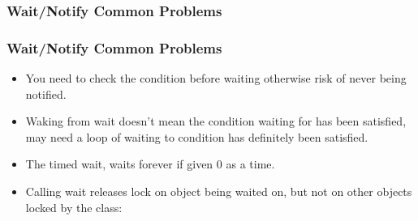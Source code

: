 \documentclass{beamer}
\begin{document}
\subsubsection{Wait/Notify Common Problems}
\begin{frame}
\frametitle{Wait/Notify Common Problems}
\begin{itemize}
\item You need to check the condition before waiting otherwise risk of never being notified.
\item Waking from wait doesn't mean the condition waiting for has been satisfied, may need a loop of waiting to condition has definitely been satisfied.
\item The timed wait, waits forever if given 0 as a time.
\item Calling wait releases lock on object being waited on, but not on other objects locked by the class:
\locks
\end{itemize}
\end{frame}
\end{document}
